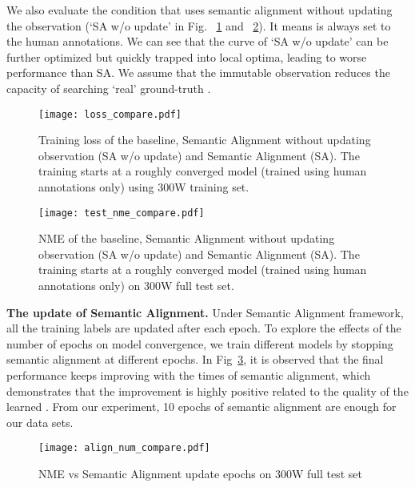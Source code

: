 \documentclass[10pt,twocolumn,letterpaper]{article}
\begin{document}
{{{			{We also evaluate the condition that uses semantic alignment without updating the observation  (`SA w/o update' in Fig. ~\ref{fig:loss_compare} and ~\ref{fig:nme_compare}). It means   is always set to the human annotations. We can see that 
				the curve of `SA w/o update' can be further optimized but quickly trapped into local optima, leading to
				worse performance than SA. We assume that the immutable observation  reduces the capacity of searching `real' 
				ground-truth . }
			
			
}
		
		
		\begin{figure}[!thp]
			\begin{center}
\texttt{[image: loss\_compare.pdf]}
			\end{center}
			\caption{Training loss of the baseline, 
Semantic Alignment without updating observation (SA w/o update) and Semantic Alignment (SA). The training starts at a roughly converged model (trained using human annotations only) using 300W training set.}
			\label{fig:loss_compare}
		\end{figure}
		


		
		\begin{figure}[!thp]
			\begin{center}
\texttt{[image: test\_nme\_compare.pdf]}
			\end{center}
\caption{NME of the baseline, 
				Semantic Alignment without updating observation (SA w/o update) and Semantic Alignment (SA). The training starts at a roughly converged model (trained using human annotations only) on 300W full test set.}
			\label{fig:nme_compare}
		\end{figure}
		
		
		\textbf{The update of Semantic Alignment.}
		Under Semantic Alignment framework, all the training labels are updated after each epoch. {To explore the effects of the number of epochs 
			on model convergence, }we train different 
		models by stopping  semantic alignment at different epochs.
In 	Fig~\ref{fig:align_num1}, it is  observed that the final performance keeps 
		improving
		with the times of semantic alignment, 
		{which demonstrates that the improvement is highly positive related to the quality of the learned .
}
From our experiment, 10 epochs of semantic alignment are enough for our data sets.
		
		\begin{figure}[!thp]
			\begin{center}
\texttt{[image: align\_num\_compare.pdf]}
			\end{center}
			\caption{NME vs Semantic Alignment update epochs on 300W full test set}
			\label{fig:align_num1}
		\end{figure}
		
}}
\end{document}
